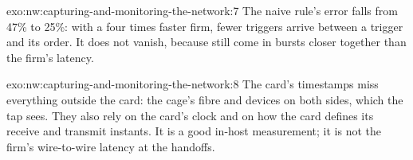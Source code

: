\begin{solution}{exo:nw:capturing-and-monitoring-the-network:7}
The naive rule's error falls from 47\% to 25\%: with a four times faster firm, fewer triggers arrive between a trigger and its order. It does
not vanish, because  still come in bursts closer together than the firm's latency.
\end{solution}

\begin{solution}{exo:nw:capturing-and-monitoring-the-network:8}
The card's timestamps miss everything outside the card: the cage's fibre and devices on both sides, which the tap sees. They also rely on the
card's clock and on how the card defines its receive and transmit instants. It is a good in-host measurement; it is not the firm's
wire-to-wire latency at the handoffs.
\end{solution}

